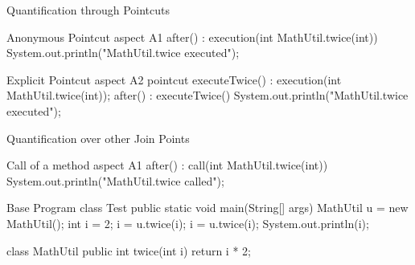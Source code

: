 \begin{frame}[fragile]{Quantification through Pointcuts}
	\begin{mycolumns}[widths={50,50},animation=none]
	\mynextcolumn
\begin{codetight}{Anonymous Pointcut}
aspect A1 {
	after() : execution(int MathUtil.twice(int)) {
		System.out.println("MathUtil.twice executed");
	}
}
\end{codetight}			
\begin{codetight}{Explicit Pointcut}
aspect A2 {
	pointcut executeTwice() : execution(int MathUtil.twice(int));
	after() : executeTwice() {
		System.out.println("MathUtil.twice executed");
	}
}
\end{codetight}			
	\end{mycolumns}
\end{frame}

\begin{frame}[fragile]{Quantification over other Join Points}
	\begin{mycolumns}[widths={50,50},animation=none]
\begin{codetight}{Call of a method}
aspect A1 {
	after() : call(int MathUtil.twice(int)) {
		System.out.println("MathUtil.twice called");
	}
}
\end{codetight}
	\mynextcolumn
\begin{codetight}{Base Program}
class Test {
	public static void main(String[] args) {
		MathUtil u = new MathUtil();
		int i = 2;
		i = u.twice(i);
		i = u.twice(i);
		System.out.println(i);
	}
}

class MathUtil {
	public int twice(int i) {
		return i * 2;
	}
}
\end{codetight}	
	\end{mycolumns}
\end{frame}

